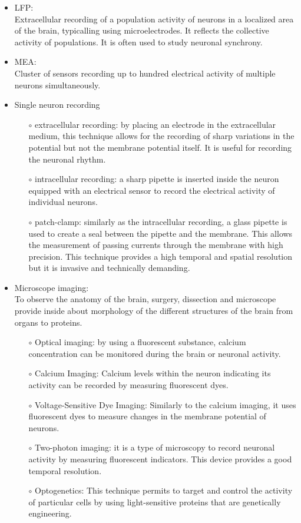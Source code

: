 \begin{itemize}
    \item \acrfull{LFP}:\\
    Extracellular recording of a population activity of neurons in a localized area of the brain, typicalling using microelectrodes. It reflects the collective activity of populations. It is often used to study neuronal synchrony. 
    \item \acrfull{MEA}:\\
    Cluster of sensors recording up to hundred electrical activity of multiple neurons simultaneously.  
    \item Single neuron recording 
    \begin{itemize}
        \item[$\circ$] extracellular recording: by placing an electrode in the extracellular medium, this technique allows for the recording of sharp variations in the potential but not the membrane potential itself. It is useful for recording the neuronal rhythm. 
        \item[$\circ$] intracellular recording: a sharp pipette is inserted inside the neuron equipped with an electrical sensor to record the electrical activity of individual neurons.
        \item[$\circ$] patch-clamp: similarly as the intracellular recording, a glass pipette is used to create a seal between the pipette and the membrane. This allows the measurement of passing currents through the membrane with high precision. This technique provides a high temporal and spatial resolution but it is invasive and technically demanding. 
    \end{itemize}
    \item Microscope imaging:    \\
    To observe the anatomy of the brain, surgery, dissection and microscope provide inside about morphology of the different structures of the brain from organs to proteins. 
    \begin{itemize}
        \item[$\circ$] Optical imaging: by using a fluorescent substance, calcium concentration can be monitored during the brain or neuronal activity.
        \item[$\circ$]  Calcium Imaging: Calcium levels within the neuron indicating its activity can be recorded by measuring fluorescent dyes. 
        \item[$\circ$] Voltage-Sensitive Dye Imaging: Similarly to the calcium imaging, it uses fluorescent dyes to measure changes in the membrane potential of neurons.
        \item[$\circ$] Two-photon imaging: it is a type of microscopy to record neuronal activity by measuring fluorescent indicators. This device provides a good temporal resolution.  
        \item[$\circ$] Optogenetics: This technique permits to target and control the activity of particular cells by using light-sensitive proteins that are genetically engineering. 
    \end{itemize}

\end{itemize}
